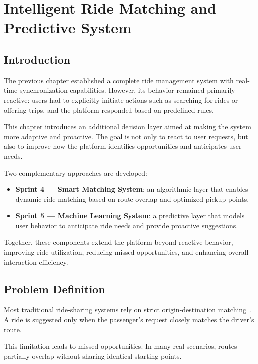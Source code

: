 \chapter{Intelligent Ride Matching and Predictive System}

\section{Introduction}

The previous chapter established a complete ride management system with real-time synchronization capabilities. However, its behavior remained primarily reactive: users had to explicitly initiate actions such as searching for rides or offering trips, and the platform responded based on predefined rules.

This chapter introduces an additional decision layer aimed at making the system more adaptive and proactive. The goal is not only to react to user requests, but also to improve how the platform identifies opportunities and anticipates user needs.

Two complementary approaches are developed:

\begin{itemize}
    \item \textbf{Sprint 4 — Smart Matching System}: an algorithmic layer that enables dynamic ride matching based on route overlap and optimized pickup points.
    \item \textbf{Sprint 5 — Machine Learning System}: a predictive layer that models user behavior to anticipate ride needs and provide proactive suggestions.
\end{itemize}

Together, these components extend the platform beyond reactive behavior, improving ride utilization, reducing missed opportunities, and enhancing overall interaction efficiency.

\section{Problem Definition}

Most traditional ride-sharing systems rely on strict origin-destination matching~\cite{furuhata2013ridesharing}. A ride is suggested only when the passenger’s request closely matches the driver’s route.

This limitation leads to missed opportunities. In many real scenarios, routes partially overlap without sharing identical starting points.

